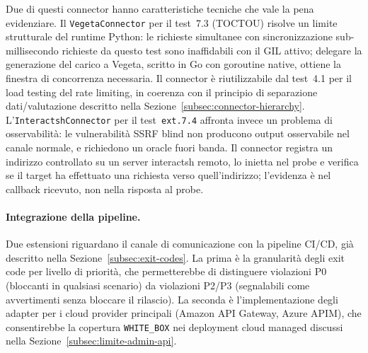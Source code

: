 Due di questi connector hanno caratteristiche tecniche che vale la pena evidenziare. Il \texttt{VegetaConnector} per il test~7.3 (\gls{TOCTOU}) risolve un limite strutturale del runtime Python: le richieste simultanee con sincronizzazione sub-millisecondo richieste da questo test sono inaffidabili con il \gls{GIL} attivo; delegare la generazione del carico a Vegeta, scritto in Go con goroutine native, ottiene la finestra di concorrenza necessaria. Il connector è riutilizzabile dal test~4.1 per il load testing del rate limiting, in coerenza con il principio di separazione dati/valutazione descritto nella Sezione~\ref{subsec:connector-hierarchy}. L'\texttt{InteractshConnector} per il test~\texttt{ext.7.4} affronta invece un problema di osservabilità: le vulnerabilità \gls{SSRF} blind non producono output osservabile nel canale normale, e richiedono un oracle fuori banda. Il connector registra un indirizzo controllato su un server interactsh remoto, lo inietta nel probe e verifica se il target ha effettuato una richiesta verso quell'indirizzo; l'evidenza è nel callback ricevuto, non nella risposta al probe.

\paragraph{Integrazione della pipeline.}
Due estensioni riguardano il canale di comunicazione con la pipeline \gls{CI/CD}, già descritto nella Sezione~\ref{subsec:exit-codes}. La prima è la granularità degli exit code per livello di priorità, che permetterebbe di distinguere violazioni P0 (bloccanti in qualsiasi scenario) da violazioni P2/P3 (segnalabili come avvertimenti senza bloccare il rilascio). La seconda è l'implementazione degli adapter per i cloud provider principali (Amazon \gls{API} Gateway, Azure \gls{APIM}), che consentirebbe la copertura \texttt{WHITE\_BOX} nei deployment cloud managed discussi nella Sezione~\ref{subsec:limite-admin-api}.

